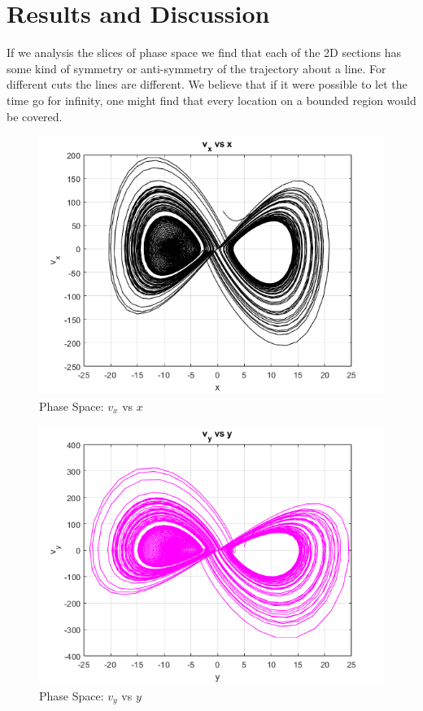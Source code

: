\documentclass[%
reprint,
amsmath,amssymb,
aps,
floatfix,
]{revtex4-2}
\begin{document}
	\section{Results and Discussion}
	If we analysis the slices of phase space we find that each of the 2D sections has some kind of symmetry or anti-symmetry of the trajectory about a line. For different cuts the lines are different. We believe that if it were possible to let the time go for infinity, one might find that every location on a bounded region would be covered. 
	\FloatBarrier
	\begin{figure}[htbp]
		\centering
		\includegraphics[width=0.8\linewidth]{v_x_vs_x.png}
		\caption{Phase Space: $v_x$ vs $x$}
		\label{fig:vx_x}
	\end{figure}
	
	\begin{figure}[htbp]
		\centering
		\includegraphics[width=0.8\linewidth]{v_y_vs_y.png}
		\caption{Phase Space: $v_y$ vs $y$}
		\label{fig:vy_y}
	\end{figure}
	
\end{document}
